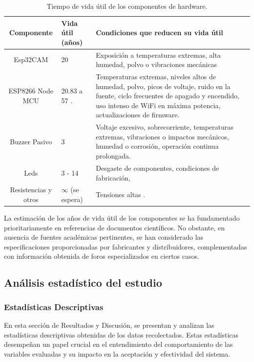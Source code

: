 \begin{table}[h]
\centering
\caption{Tiempo de vida útil de los componentes de hardware.}
\label{tab:ShelfLife}
\begin{tabularx}{\textwidth}{cXX}
	\toprule
	\textbf{Componente} & \textbf{Vida útil (años)} & Condiciones que reducen su vida útil\\
	\midrule
	Esp32CAM & 20 \citep{Espressif2022ESP32-CAM,Espressif2022ESP32Forum} & Exposición a temperaturas extremas, alta humedad, polvo o vibraciones mecánicas\\
	ESP8266 Node MCU & 20.83 \citep{Amri2018Improving} a 57 \citep{Ardumotica2023,Espressif2022ESP32Forum}. & Temperaturas extremas, niveles altos de humedad, polvo, picos de voltaje, ruido en la fuente, ciclo frecuentes de apagado y encendido, uso intenso de WiFi en máxima potencia, actualizaciones de firmware.\\
	Buzzer Pasivo & 3 \citep{HuawhaElectronics} & Voltaje excesivo, sobrecorriente, temperaturas extremas, vibraciones o impactos mecánicos, humedad o corrosión, operación continua prolongada. \\
	Leds & 3 \citep{Casamayor2015} - 14 \citep{Cary,GreenLighting2024} & Desgaste de componentes, condiciones de fabricación, \\
	Resistencias y otros & $\infty$ (se espera) & Tensiones altas \citep{Simon2017Evolution}. \\
	\bottomrule
\end{tabularx}
\end{table}
La estimación de los años de vida útil de los componentes se ha fundamentado prioritariamente en referencias de documentos científicos. No obstante, en ausencia de fuentes académicas pertinentes, se han considerado las especificaciones proporcionadas por fabricantes y distribuidores, complementadas con información obtenida de foros especializados en ciertos casos.

\subsection{Análisis estadístico del estudio}
\subsubsection{Estadísticas Descriptivas}
En esta sección de Resultados y Discusión, se presentan y analizan las estadísticas descriptivas obtenidas de los datos recolectados. Estas estadísticas desempeñan un papel crucial en el entendimiento del comportamiento de las variables evaluadas y su impacto en la aceptación y efectividad del sistema.

